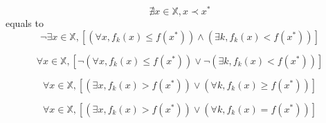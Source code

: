 \documentclass[10pt,a4paper]{article}
\begin{document}
\begin{equation}
\nexists x \in \mathbb{X}, x \prec x^{*}
\end{equation}
equals to 
\begin{equation}
\lnot \exists x \in \mathbb{X}, \left[  \left( \forall x, f_{k} (x) \leq f(x^{*}) \right) \land \left( \exists k, f_{k} (x) < f(x^{*}) \right)  \right]
\end{equation}

\begin{equation}
\forall x \in \mathbb{X}, \left[ \lnot \left( \forall x, f_{k} (x) \leq f(x^{*}) \right) \lor \lnot \left( \exists k, f_{k} (x) < f(x^{*}) \right) \right]
\end{equation}

\begin{equation}
\forall x \in \mathbb{X}, \left[ \left( \exists x, f_{k} (x) > f(x^{*}) \right) \lor \left( \forall k, f_{k} (x) \geq f(x^{*}) \right) \right]
\end{equation}

\begin{equation}
\forall x \in \mathbb{X}, \left[ \left( \exists x, f_{k} (x) > f(x^{*}) \right) \lor \left( \forall k, f_{k} (x) = f(x^{*}) \right) \right]
\end{equation}
\end{document}
